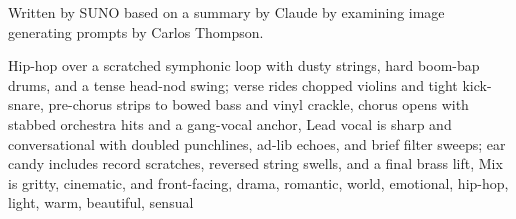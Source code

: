 
\begin{notes}
Written by SUNO based on a summary by Claude by examining image generating prompts by Carlos Thompson.
\end{notes}
\begin{style}
Hip-hop over a scratched symphonic loop with dusty strings, hard boom-bap drums, and a tense head-nod swing; verse rides chopped violins and tight kick-snare, pre-chorus strips to bowed bass and vinyl crackle, chorus opens with stabbed orchestra hits and a gang-vocal anchor, Lead vocal is sharp and conversational with doubled punchlines, ad-lib echoes, and brief filter sweeps; ear candy includes record scratches, reversed string swells, and a final brass lift, Mix is gritty, cinematic, and front-facing, drama, romantic, world, emotional, hip-hop, light, warm, beautiful, sensual
\end{style}
